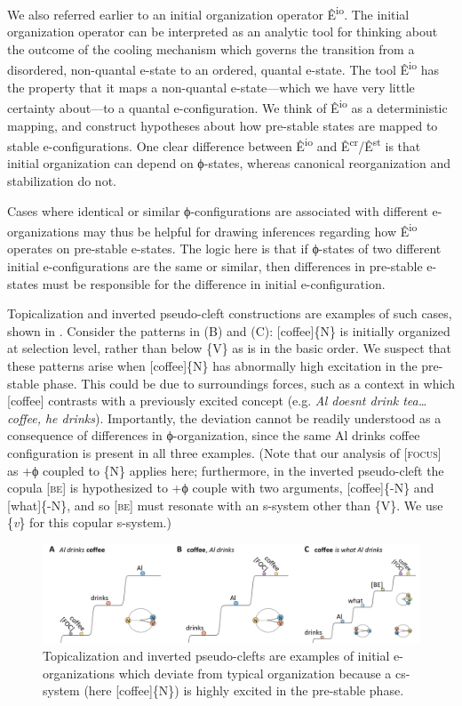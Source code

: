   We also referred earlier to an initial organization operator Ê\textsuperscript{io}. The initial organization operator can be interpreted as an analytic tool for thinking about the outcome of the cooling mechanism which governs the transition from a disordered, non-quantal e-state to an ordered, quantal e-state. The tool Ê\textsuperscript{io} has the property that it maps a non-quantal e-state—which we have very little certainty about—to a quantal e-configuration. We think of Ê\textsuperscript{io} as a deterministic mapping, and construct hypotheses about how pre-stable states are mapped to stable e-configurations. One clear difference between Ê\textsuperscript{io} and Ê\textsuperscript{cr}/Ê\textsuperscript{st} is that initial organization can depend on ϕ-states, whereas canonical reorganization and stabilization do not. 

  Cases where identical or similar ϕ-configurations are associated with different e-organizations may thus be helpful for drawing inferences regarding how Ê\textsuperscript{io} operates on pre-stable e-states. The logic here is that if ϕ-states of two different initial e-configurations are the same or similar, then differences in pre-stable e-states must be responsible for the difference in initial e-configuration. 

  Topicalization and inverted pseudo-cleft constructions are examples of such cases, shown in {}. Consider the patterns in (B) and (C): [coffee]\{N\} is initially organized at selection level, rather than below \{V\} as is in the basic order. We suspect that these patterns arise when [coffee]\{N\} has abnormally high excitation in the pre-stable phase. This could be due to surroundings forces, such as a context in which [coffee] contrasts with a previously excited concept (e.g. \textit{Al doesnt drink tea…coffee, he drinks}). Importantly, the deviation cannot be readily understood as a consequence of differences in ϕ-organization, since the same {\textbar}Al drinks coffee{\textbar} configuration is present in all three examples. (Note that our analysis of [\textsc{focus}] as +ϕ coupled to \{N\} applies here; furthermore, in the inverted pseudo-cleft the copula [\textsc{be}] is hypothesized to +ϕ couple with two arguments, [coffee]\{-N\} and [what]\{-N\}, and so [\textsc{be}] must resonate with an s-system other than \{V\}. We use \{\textit{v}\} for this copular s-system.)

  
\begin{figure}
\includegraphics[width=\textwidth]{figures/Tilsen-img78.png}
\caption{Topicalization and inverted pseudo-clefts are examples of initial e-organizations which deviate from typical organization because a cs-system (here [coffee]\{N\}) is highly excited in the pre-stable phase.}
\label{fig:4:28}
\end{figure}
 

